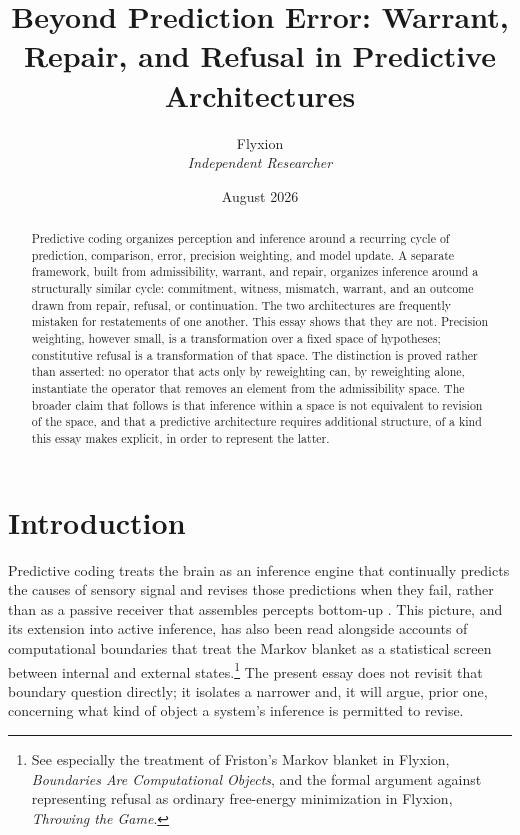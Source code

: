 \documentclass[11pt]{article}
\title{\textbf{Beyond Prediction Error: Warrant, Repair, and Refusal in Predictive Architectures}}
\author{Flyxion\\ \textit{Independent Researcher}}
\date{August 2026}
\begin{document}
\maketitle

\begin{abstract}
Predictive coding organizes perception and inference around a recurring cycle of prediction, comparison, error, precision weighting, and model update. A separate framework, built from admissibility, warrant, and repair, organizes inference around a structurally similar cycle: commitment, witness, mismatch, warrant, and an outcome drawn from repair, refusal, or continuation. The two architectures are frequently mistaken for restatements of one another. This essay shows that they are not. Precision weighting, however small, is a transformation over a fixed space of hypotheses; constitutive refusal is a transformation of that space. The distinction is proved rather than asserted: no operator that acts only by reweighting can, by reweighting alone, instantiate the operator that removes an element from the admissibility space. The broader claim that follows is that inference within a space is not equivalent to revision of the space, and that a predictive architecture requires additional structure, of a kind this essay makes explicit, in order to represent the latter.
\end{abstract}

\newpage

\section{Introduction}

Predictive coding treats the brain as an inference engine that continually predicts the causes of sensory signal and revises those predictions when they fail, rather than as a passive receiver that assembles percepts bottom-up \citep{raoballard1999,friston2010}. This picture, and its extension into active inference, has also been read alongside accounts of computational boundaries that treat the Markov blanket as a statistical screen between internal and external states.\footnote{See especially the treatment of Friston's Markov blanket in Flyxion, \emph{Boundaries Are Computational Objects}, and the formal argument against representing refusal as ordinary free-energy minimization in Flyxion, \emph{Throwing the Game}.} The present essay does not revisit that boundary question directly; it isolates a narrower and, it will argue, prior one, concerning what kind of object a system's inference is permitted to revise.
\end{document}
